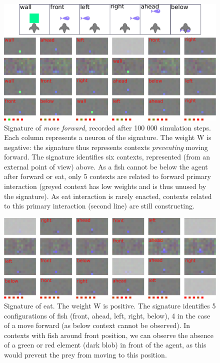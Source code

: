 \documentclass[conference]{IEEEtran}
\begin{document}
\begin{figure}[ht]
\centerline{\includegraphics[scale=0.32]{img/sig_forward.pdf}}
\caption{Signature of \textit{move forward}, recorded after 100 000 simulation steps. Each column represents a neuron of the signature. The weight W is negative: the signature thus represents contexts \textit{preventing} moving forward. The signature identifies six contexts, represented (from an external point of view) above. As a fish cannot be below the agent after forward or eat, only 5 contexts are related to forward primary interaction (greyed context has low weights and is thus unused by the signature). As eat interaction is rarely enacted, contexts related to this primary interaction (second line) are still constructing.
}
\label{fig:forward}
\end{figure}



\begin{figure}[t]
\centerline{\includegraphics[scale=0.32]{img/sig_eat.pdf}}
\caption{Signature of eat. The weight W is positive.
The signature identifies 5 configurations of fish (front, ahead, left, right, below), 4 in the case of a move forward (as below context cannot be observed). In contexts with fish around front position, we can observe the absence of a green or red element (dark blob) in front of the agent, as this would prevent the prey from moving to this position.}
\label{fig:eat}
\end{figure}
\end{document}
